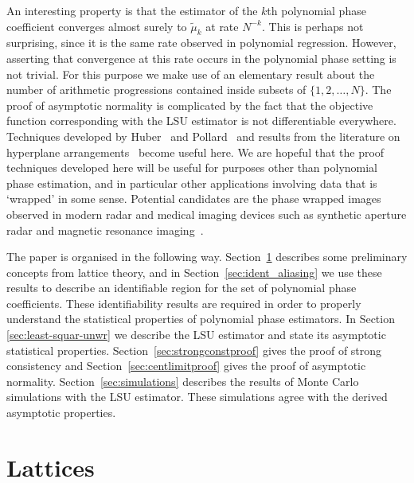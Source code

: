 \documentclass[aap]{imsart}
\begin{document}
An interesting property is that the estimator of the $k$th polynomial phase coefficient converges almost surely to $\tilde{\mu}_k$ at rate $N^{-k}$.  This is perhaps not surprising, since it is the same rate observed in polynomial regression.  However, asserting that convergence at this rate occurs in the polynomial phase setting is not trivial.  For this purpose we make use of an elementary result about the number of arithmetic progressions contained inside subsets of $\{1,2,\dots,N\}$.  %
The proof of asymptotic normality is complicated by the fact that the objective function corresponding with the LSU estimator is not differentiable everywhere.  Techniques developed by Huber~\cite{Huberrobustest1964,Huberbehavmaxnonstandard1967} and Pollard~\cite{Pollard_new_ways_clts_1986,Pollard_asymp_empi_proc_1989} and results from the literature on hyperplane arrangements~\cite{Chazelle_discrepency_method_2000,Matousek_lect_disc_geom_2002} become useful here.  We are hopeful that the proof techniques developed here will be useful for purposes other than polynomial phase estimation, and in particular other applications involving data that is `wrapped' in some sense.  Potential candidates are the phase wrapped images observed in modern radar and medical imaging devices such as synthetic aperture radar and magnetic resonance imaging~\cite{Nico_phaseunwrappingSAR_2000}.

The paper is organised in the following way. Section~\ref{sec:lattice-theory} describes some preliminary concepts from lattice theory, and in Section~\ref{sec:ident_aliasing} we use these results to describe an identifiable region for the set of polynomial phase coefficients.  These identifiability results are required in order to properly understand the statistical properties of polynomial phase estimators. In Section \ref{sec:least-squar-unwr} we describe the LSU estimator and state its asymptotic statistical properties.  Section~\ref{sec:strongconstproof} gives the proof of strong consistency and Section~\ref{sec:centlimitproof} gives the proof of asymptotic normality. 
Section~\ref{sec:simulations} describes the results of Monte Carlo simulations with the LSU estimator.  These simulations agree with the derived asymptotic properties. 

\section{Lattices}\label{sec:lattice-theory}
\end{document}
